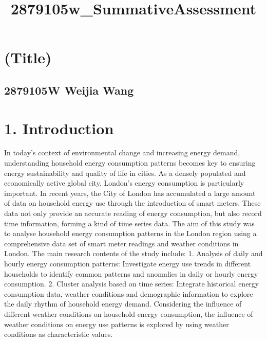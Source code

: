 \documentclass[11pt]{article}
\title{2879105w\_SummativeAssessment}
\begin{document}
    
    \maketitle
    
    

    
    \section{(Title)}\label{title}

\subsection{2879105W Weijia Wang}\label{w-weijia-wang}

    \section{1. Introduction}\label{introduction}

In today's context of environmental change and increasing energy demand,
understanding household energy consumption patterns becomes key to
ensuring energy sustainability and quality of life in cities. As a
densely populated and economically active global city, London's energy
consumption is particularly important. In recent years, the City of
London has accumulated a large amount of data on household energy use
through the introduction of smart meters. These data not only provide an
accurate reading of energy consumption, but also record time
information, forming a kind of time series data. The aim of this study
was to analyse household energy consumption patterns in the London
region using a comprehensive data set of smart meter readings and
weather conditions in London. The main research contents of the study
include: 1. Analysis of daily and hourly energy consumption patterns:
Investigate energy use trends in different households to identify common
patterns and anomalies in daily or hourly energy consumption. 2. Cluster
analysis based on time series: Integrate historical energy consumption
data, weather conditions and demographic information to explore the
daily rhythm of household energy demand. Considering the influence of
different weather conditions on household energy consumption, the
influence of weather conditions on energy use patterns is explored by
using weather conditions as characteristic values.
\end{document}
